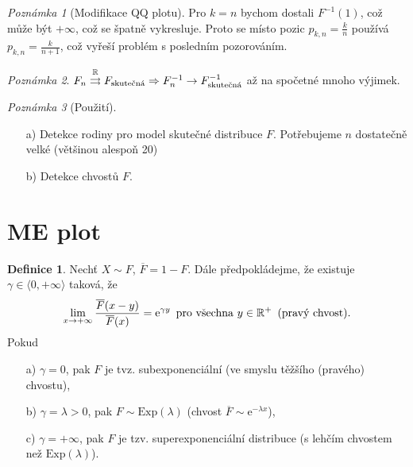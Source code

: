 \documentclass{article}
\theoremstyle{remark}
\newtheorem*{remark}{Poznámka}
\theoremstyle{plain}
\theoremstyle{definition}
\newtheorem{definition}[subsubsection]{Definice}
\theoremstyle{remark}
\begin{document}
\begin{remark}[Modifikace QQ plotu]
Pro $k=n$ bychom dostali $F^{-1}(1)$, což může být $+\infty$, což se špatně vykresluje. Proto se místo pozic $p_{k,n}=\frac{k}{n}$ používá $p_{k,n}=\frac{k}{n+1}$, což vyřeší problém s posledním pozorováním.
\end{remark}

\begin{remark}
$ F_n\overset{\mathbb{R}}{\rightrightarrows}F_{\textnormal{skutečná}} \Rightarrow F_n^{-1}\rightarrow F^{-1}_{\textnormal{skutečná}}$ až na spočetné mnoho výjimek. 
\end{remark}

\begin{remark}[Použití]
\begin{enumerate}
    \item[a)] Detekce rodiny pro model skutečné distribuce $F$. Potřebujeme $n$ dostatečně velké (většinou alespoň 20)
    \item[b)] Detekce chvostů $F$.
\end{enumerate}
\end{remark}

\section{ME plot}

\begin{definition}
Nechť $X\sim F$, $\overline{F}=1-F$. Dále předpokládejme, že existuje $\gamma\in\langle0,+\infty\rangle$ taková, že
\begin{align*}
    \lim_{x\rightarrow +\infty}\frac{\overline{F}(x-y)}{\overline{F}(x)}=\mathrm{e}^{\gamma y}\,\textnormal{ pro všechna }y\in\mathbb{R}^{+}\,\textnormal{ (pravý chvost)}.
\end{align*}
Pokud \begin{enumerate}
    \item[a)] $\gamma=0$, pak $F$ je tvz. subexponenciální (ve smyslu těžšího (pravého) chvostu),
    \item[b)] $\gamma=\lambda>0$, pak $F\sim\mathrm{Exp}(\lambda)$ (chvost $\overline{F}\sim\mathrm{e}^{-\lambda x}$),
    \item[c)] $\gamma=+\infty$, pak $F$ je tzv. superexponenciální distribuce (s lehčím
    chvostem než $\mathrm{Exp}(\lambda)$).
\end{enumerate}
\end{definition}
\end{document}
